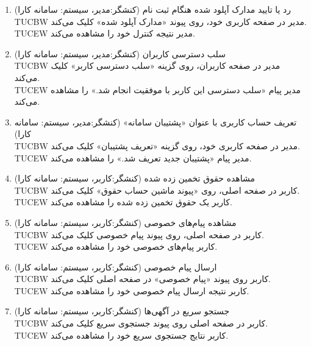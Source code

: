 \documentclass[12pt]{article}
\begin{document}
\begin{enumerate}
		\item
		رد یا تایید مدارک آپلود شده هنگام ثبت نام (کنشگر:‌مدیر، سیستم: سامانه کارا)\\
		TUCBW مدیر در صفحه کاربری خود، روی پیوند «مدارک آپلود شده» کلیک می‌کند.\\
		TUCEW مدیر نتیجه کنترل خود را مشاهده می‌کند.\\

		\item
		سلب دسترسی کاربران (کنشگر:‌مدیر، سیستم: سامانه کارا)\\
		TUCBW مدیر در صفحه کاربران، روی گزینه «سلب دسترسی کاربر» کلیک می‌کند.\\
		TUCEW مدیر پیام «سلب دسترسی این کاربر با موفقیت انجام شد.» را مشاهده می‌کند.\\

		\item
		تعریف حساب کاربری با عنوان «پشتیبان سامانه» (کنشگر:‌مدیر، سیستم: سامانه کارا)\\
		TUCBW مدیر در صفحه کاربری خود، روی گزینه «تعریف پشتیبان» کلیک می‌کند.\\
		TUCEW مدیر پیام «پشتیبان جدید تعریف شد.» را مشاهده می‌کند.\\

		\item
		مشاهده حقوق تخمین زده شده (کنشگر:‌کاربر، سیستم: سامانه کارا)\faStar\\
		TUCBW کاربر در صفحه اصلی، روی «پیوند ماشین حساب حقوق» کلیک می‌کند.\\
		TUCEW کاربر یک حقوق تخمین زده شده را مشاهده می‌کند.\\

		\item
	مشاهده پیام‌های خصوصی (کنشگر:‌کاربر، سیستم: سامانه کارا)\\
		TUCBW کاربر در صفحه اصلی، روی پیوند پیام خصوصی کلیک می‌کند.\\
		TUCEW کاربر پیام‌های خصوصی خود را مشاهده می‌کند.\\

		\item
		ارسال پیام خصوصی (کنشگر:‌کاربر، سیستم: سامانه کارا)\faStar\\
		TUCBW کاربر روی پیوند «پیام خصوصی» در صفحه اصلی کلیک می‌کند.\\
		TUCEW کاربر نتیجه ارسال پیام خصوصی خود را مشاهده می‌کند.\\

		\item
		جستجو سریع در آگهی‌ها (کنشگر:‌کاربر، سیستم: سامانه کارا)\\
		TUCBW کاربر در صفحه اصلی روی پیوند جستجوی سریع کلیک می‌کند.\\
		TUCEW کاربر نتایج جستجوی سریع خود را مشاهده می‌کند.\\


\end{enumerate}
\end{document}
